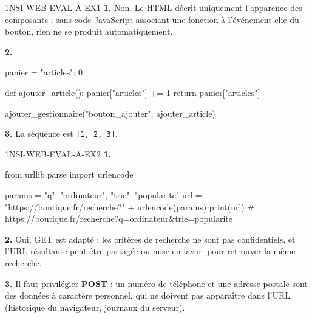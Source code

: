 \begin{corrige}{1NSI-WEB-EVAL-A-EX1}
\textbf{1.} Non. Le HTML décrit uniquement l'apparence des composants ; sans code
JavaScript associant une fonction à l'événement clic du bouton, rien ne se produit
automatiquement.

\textbf{2.}
\begin{python}
panier = {"articles": 0}

def ajouter_article():
    panier["articles"] += 1
    return panier["articles"]

ajouter_gestionnaire("bouton_ajouter", ajouter_article)
\end{python}

\textbf{3.} La séquence est \lstinline{[1, 2, 3]}.
\end{corrige}

\begin{corrige}{1NSI-WEB-EVAL-A-EX2}
\textbf{1.}
\begin{python}
from urllib.parse import urlencode

params = {"q": "ordinateur", "trie": "popularite"}
url = "https://boutique.fr/recherche?" + urlencode(params)
print(url)
# https://boutique.fr/recherche?q=ordinateur&trie=popularite
\end{python}

\textbf{2.} Oui, GET est adapté : les critères de recherche ne sont pas confidentiels, et
l'URL résultante peut être partagée ou mise en favori pour retrouver la même recherche.

\textbf{3.} Il faut privilégier \textbf{POST} : un numéro de téléphone et une adresse
postale sont des données à caractère personnel, qui ne doivent pas apparaître dans l'URL
(historique du navigateur, journaux du serveur).
\end{corrige}
